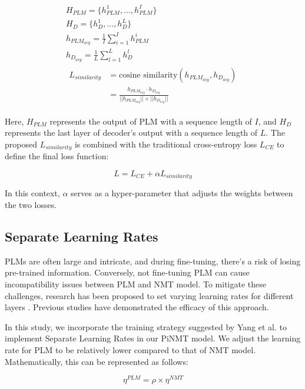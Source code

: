 \documentclass[conference]{IEEEtran}
\begin{document}
\begin{gather}
H_{PLM} = \{ h_{PLM}^1, \dots, h_{PLM}^I \} \\
H_D = \{ h_{D}^1, \dots, h_{D}^L \} \\
h_{PLM_{avg}} = \frac{1}{I} \sum_{i=1}^{I} h_{PLM}^i \\
h_{D_{avg}} = \frac{1}{L} \sum_{l=1}^{L} h_{D}^l \\
\begin{aligned}
L_{similarity} &= \text{cosine similarity}(h_{PLM_{avg}}, h_{D_{avg}}) \\
&= \frac{h_{PLM_{avg}} \cdot h_{D_{avg}}}{||h_{PLM_{avg}}|| \times ||h_{D_{avg}}||}
\end{aligned}
\end{gather}


Here, \( H_{PLM} \) represents the output of PLM with a sequence length of \( I \), and \( H_D \) represents the last layer of decoder's output with a sequence length of \( L \). The proposed \( L_{similarity} \) is combined with the traditional cross-entropy loss \( L_{CE} \) to define the final loss function:

\begin{equation}
L = L_{CE} + \alpha L_{similarity}
\end{equation}

In this context, \( \alpha \) serves as a hyper-parameter that adjusts the weights between the two losses.

\subsection{Separate Learning Rates}
PLMs are often large and intricate, and during fine-tuning, there's a risk of losing pre-trained information. Conversely, not fine-tuning PLM can cause incompatibility issues between PLM and NMT model. To mitigate these challenges, research has been proposed to set varying learning rates for different layers \cite{Howard2018, Sun2019, Yang2019}. Previous studies have demonstrated the efficacy of this approach.

In this study, we incorporate the training strategy suggested by Yang et al. \cite{Yang2019} to implement Separate Learning Rates in our PiNMT model. We adjust the learning rate for PLM to be relatively lower compared to that of NMT model. Mathematically, this can be represented as follows:

\begin{equation}
\eta^{PLM} = \rho \times \eta^{NMT}
\end{equation}
\end{document}
